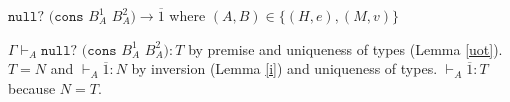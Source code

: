 \begin{case}
$\mathtt{null?}$ $(\mathtt{cons}$ $B_{A}^{1}$ $B_{A}^{2})\rightarrow\overline{1}$ where $(A,B)\in\lbrace(H,e),(M,v)\rbrace$

$\Gamma\vdash_{A}\mathtt{null?}$ $(\mathtt{cons}$ $B_{A}^{1}$ $B_{A}^{2}):T$ by premise and uniqueness of types (Lemma \ref{uot}).  $T=N$ and $\vdash_{A}\overline{1}:N$ by inversion (Lemma \ref{i}) and uniqueness of types.  $\vdash_{A}\overline{1}:T$ because $N=T$.
\end{case}